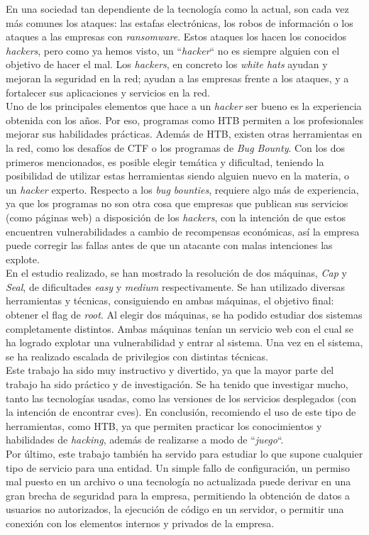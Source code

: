 En una sociedad tan dependiente de la tecnología como la actual, son cada vez más comunes los ataques: las estafas electrónicas, los robos de información o los ataques a las empresas con \textit{ransomware}. Estos ataques los hacen los conocidos \textit{hackers}, pero como ya hemos visto, un ``\textit{hacker}`` no es siempre alguien con el objetivo de hacer el mal. Los \textit{hackers}, en concreto los \textit{white hats} ayudan y mejoran la seguridad en la red; ayudan a las empresas frente a los ataques, y a fortalecer sus aplicaciones y servicios en la red.\\

Uno de los principales elementos que hace a un \textit{hacker} ser bueno es la experiencia obtenida con los años. Por eso, programas como \acrfull{HTB} permiten a los profesionales mejorar sus habilidades prácticas. Además de \acrshort{HTB}, existen otras herramientas en la red, como los desafíos de \acrlong{CTF} o los programas de \textit{Bug Bounty}. Con los dos primeros mencionados, es posible elegir temática y dificultad, teniendo la posibilidad de utilizar estas herramientas siendo alguien nuevo en la materia, o un \textit{hacker} experto. Respecto a los \textit{bug bounties}, requiere algo más de experiencia, ya que los programas no son otra cosa que empresas que publican sus servicios (como páginas web) a disposición de los \textit{hackers}, con la intención de que estos encuentren vulnerabilidades a cambio de recompensas económicas, así la empresa puede corregir las fallas antes de que un atacante con malas intenciones las explote.\\

En el estudio realizado, se han mostrado la resolución de dos máquinas, \textit{Cap} y \textit{Seal}, de dificultades \textit{easy} y \textit{medium} respectivamente. Se han utilizado diversas herramientas y técnicas, consiguiendo en ambas máquinas, el objetivo final: obtener el flag de \textit{root}. Al elegir dos máquinas, se ha podido estudiar dos sistemas completamente distintos. Ambas máquinas tenían un servicio web con el cual se ha logrado explotar una vulnerabilidad y entrar al sistema. Una vez en el sistema, se ha realizado escalada de privilegios con distintas técnicas.\\

Este trabajo ha sido muy instructivo y divertido, ya que la mayor parte del trabajo ha sido práctico y de investigación. Se ha tenido que investigar mucho, tanto las tecnologías usadas, como las versiones de los servicios desplegados (con la intención de encontrar \acrshort{cve}s). En conclusión, recomiendo el uso de este tipo de herramientas, como \acrshort{HTB}, ya que permiten practicar los conocimientos y habilidades de \textit{hacking}, además de realizarse a modo de ``\textit{juego}``.\\

Por último, este trabajo también ha servido para estudiar lo que supone cualquier tipo de servicio para una entidad. Un simple fallo de configuración, un permiso mal puesto en un archivo o una tecnología no actualizada puede derivar en una gran brecha de seguridad para la empresa, permitiendo la obtención de datos a usuarios no autorizados, la ejecución de código en un servidor, o permitir una conexión con los elementos internos y privados de la empresa.